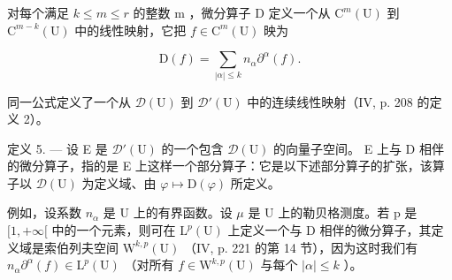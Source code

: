 对每个满足 \(k \leqslant m \leqslant r\) 的整数 m ，微分算子 D 定义一个从 \(\mathrm{C}^{m}(\mathrm{U})\) 到 \(\mathrm{C}^{m-k}(\mathrm{U})\) 中的线性映射，它把 \(f \in \mathrm{C}^{m}(\mathrm{U})\) 映为

\[
\mathrm{D} (f) = \sum_ {| \alpha | \leqslant k} n _ {\alpha} \partial^ {\alpha} (f).
\]

同一公式定义了一个从 \(\mathcal{D}(\mathrm{U})\) 到 \(\mathcal{D}'(\mathrm{U})\) 中的连续线性映射（IV, p. 208 的定义 2）。

定义 5. --- 设 E 是 \(\mathcal{D}'(\mathrm{U})\) 的一个包含 \(\mathcal{D}(\mathrm{U})\) 的向量子空间。 E 上与 D 相伴的微分算子，指的是 E 上这样一个部分算子：它是以下述部分算子的扩张，该算子以 \(\mathcal{D}(\mathrm{U})\) 为定义域、由 \(\varphi \mapsto \mathrm{D}(\varphi)\) 所定义。

例如，设系数 \(n_{\alpha}\) 是 U 上的有界函数。设 \(\mu\) 是 U 上的勒贝格测度。若 p 是 \([1,+\infty[\) 中的一个元素，则可在 \(\mathrm{L}^{p}(\mathrm{U})\) 上定义一个与 D 相伴的微分算子，其定义域是索伯列夫空间 \(\mathrm{W}^{k,p}(\mathrm{U})\) （IV, p. 221 的第 14 节），因为这时我们有 \(n_{\alpha}\partial^{\alpha}(f)\in\mathrm{L}^{p}(\mathrm{U})\) （对所有 \(f\in\mathrm{W}^{k,p}(\mathrm{U})\) 与每个 \(|\alpha|\leqslant k\) ）。

